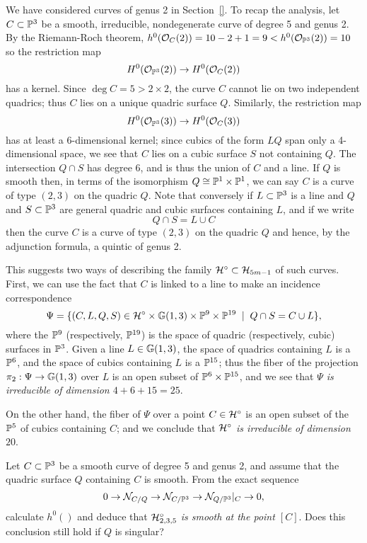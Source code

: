 We have considered curves of genus 2 in Section~\ref{}.  To recap the analysis, let $C \subset \PP^3$ be a smooth, irreducible, nondegenerate curve of degree 5 and genus 2. By the Riemann-Roch theorem,  $h^0(\cO_C(2)) = 10-2+1 = 9<h^0(\cO_{\PP^3}(2)) = 10$  so the restriction map
$$
H^0(\cO_{\PP^3}(2)) \to H^0(\cO_C(2))
$$
has a kernel. Since $\deg C = 5 > 2\times 2$, the curve $C$ cannot lie on two independent quadrics; thus $C$ lies on a unique quadric surface $Q$. Similarly, the restriction map
$$
H^0(\cO_{\PP^3}(3)) \to H^0(\cO_C(3))
$$
has at least a 6-dimensional kernel; since cubics of the form $LQ$ span only a 4-dimensional space, we see that $C$ lies on a cubic surface $S$ not containing $Q$. The intersection $Q\cap S$
has degree 6, and is thus the union of $C$ and a line. If $Q$ is smooth then, in terms of the isomorphism $Q \cong \PP^1 \times \PP^1$, we can say $C$ is a curve of type $(2,3)$ on the quadric $Q$. Note that conversely if $L \subset \PP^3$ is a line and $Q$ and $S \subset \PP^3$ are general quadric and cubic surfaces containing $L$, and if we write
$$
Q \cap S = L \cup C
$$ 
then the curve $C$ is a curve of type $(2,3)$ on the quadric $Q$ and hence, by the adjunction formula,
 a quintic of genus 2.

This suggests two ways of describing the family $\cH^\circ \subset \cH_{5m-1}$ of such curves. First, we can use the fact that $C$ is linked to a line to make an incidence correspondence
$$
\Psi = \{ (C, L, Q, S) \in \cH^\circ \times \GG(1,3) \times \PP^9 \times \PP^{19} \; \mid \; Q \cap S = C \cup L \},
$$
where the $\PP^9$ (respectively, $\PP^{19}$) is the space of quadric (respectively, cubic) surfaces in $\PP^3$. Given a line $L \in \GG(1,3)$, the space of quadrics containing $L$ is a $\PP^6$, and the space of cubics containing $L$ is a $\PP^{15}$; thus the fiber of the projection $\pi_2 : \Psi \to \GG(1,3)$ over $L$ is an open subset of $\PP^6 \times \PP^{15}$, and we see that \emph{$\Psi$ is irreducible of dimension $4 + 6 + 15 = 25$}.

On the other hand, the fiber of $\Psi$ over a point $C \in \cH^\circ$ is an open subset of the $\PP^5$ of cubics containing $C$; and we conclude that \emph{$\cH^\circ$ is irreducible of dimension $20$}.

\begin{exercise}
Let $C \subset \PP^3$ be a smooth curve of degree 5 and genus 2, and assume that the quadric surface $Q$ containing $C$ is smooth. From the exact sequence
$$
0 \to \cN_{C/Q} \to  \cN_{C/\PP^3} \to  \cN_{Q/\PP^3}|_C \to 0,
$$
calculate $h^0()$ and deduce that \emph{$\cH^\circ_{2,3,5}$ is smooth at the point $[C]$}. Does  this conclusion still hold if $Q$ is singular?
\end{exercise}

